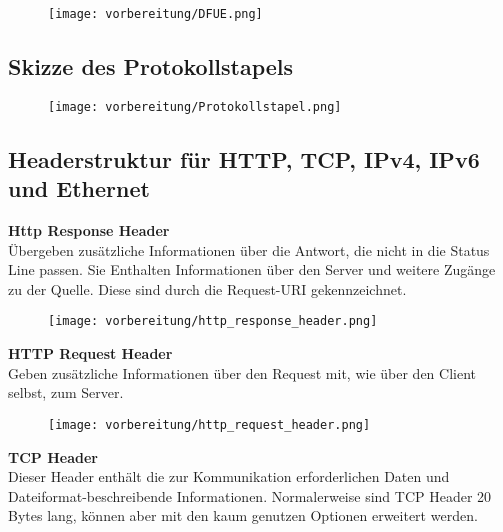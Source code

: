     \begin{figure}[H]
        \centering
        \texttt{[image: vorbereitung/DFUE.png]}
    \end{figure}
\subsection{Skizze des Protokollstapels}

    \begin{figure}[H]
        \centering
        \texttt{[image: vorbereitung/Protokollstapel.png]}
    \end{figure}

\subsection{Headerstruktur für HTTP, TCP, IPv4, IPv6 und Ethernet}

    \textbf{Http Response Header}
    \\
    Übergeben zusätzliche Informationen über die Antwort, die nicht in die Status Line passen. Sie Enthalten Informationen über den Server und weitere Zugänge zu der Quelle. Diese sind durch die Request-URI gekennzeichnet.\\

    \begin{figure}[H]
        \centering
        \texttt{[image: vorbereitung/http\_response\_header.png]}
    \end{figure}

    \textbf{HTTP Request Header}
    \\
    Geben zusätzliche Informationen über den Request mit, wie über den Client selbst, zum Server. \\
    \begin{figure}[H]
        \centering
        \texttt{[image: vorbereitung/http\_request\_header.png]}
    \end{figure}

    \textbf{TCP Header}
    \\
    Dieser Header enthält die zur Kommunikation erforderlichen Daten und Dateiformat-beschreibende Informationen. Normalerweise sind TCP Header 20 Bytes lang, können aber mit den kaum genutzen Optionen erweitert werden.\\

